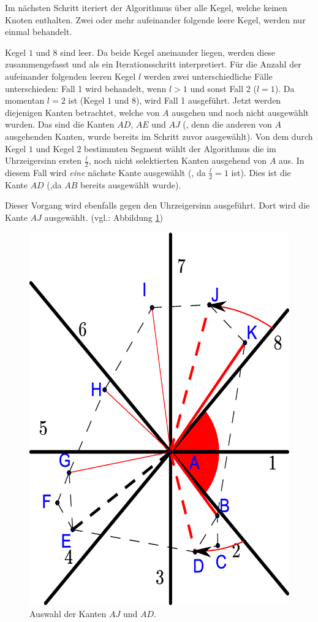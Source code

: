 \documentclass[a4paper,twoside]{IEEEtran}
\begin{document}
Im nächsten Schritt iteriert der Algorithmus über alle Kegel, welche keinen Knoten enthalten.
Zwei oder mehr aufeinander folgende leere Kegel, werden nur einmal behandelt.

Kegel $1 $ und $8 $ sind leer.
Da beide Kegel aneinander liegen, werden diese zusammengefasst und als ein Iterationsschritt interpretiert.
Für die Anzahl der aufeinander folgenden leeren Kegel $l $ werden zwei unterschiedliche Fälle unterschieden:
Fall 1 wird behandelt, wenn $l>1 $ und sonst Fall 2 ($l=1 $).
Da momentan $l=2 $ ist (Kegel $1 $ und $8 $), wird Fall 1 ausgeführt.
Jetzt werden diejenigen Kanten betrachtet, welche von $A $ ausgehen und noch nicht ausgewählt wurden.
Das sind die Kanten $AD $, $AE$ und $AJ $ (, denn die anderen von $A $ ausgehenden Kanten, wurde bereits im Schritt zuvor ausgewählt).
Von dem durch Kegel $1 $ und Kegel $2 $ bestimmten Segment wählt der Algorithmus die im Uhrzeigersinn ersten $\frac{l}{2} $, noch nicht selektierten Kanten ausgehend von $A $ aus.
In diesem Fall wird \emph{eine} nächste Kante ausgewählt (, da $\frac{l}{2} = 1$ ist).
Dies ist die Kante $AD $ (,da $AB $ bereits ausgewählt wurde).

Dieser Vorgang wird ebenfalls gegen den Uhrzeigersinn ausgeführt.
Dort wird die Kante $AJ $ ausgewählt. (vgl.: Abbildung \ref{fig:twoempty})

\begin{figure}[h!]
\centering
\includegraphics[width=0.6\linewidth]{twoempty_cone.eps}
\caption{Auswahl der Kanten $AJ $ und $AD $.}
\label{fig:twoempty}
\end{figure}
\end{document}
